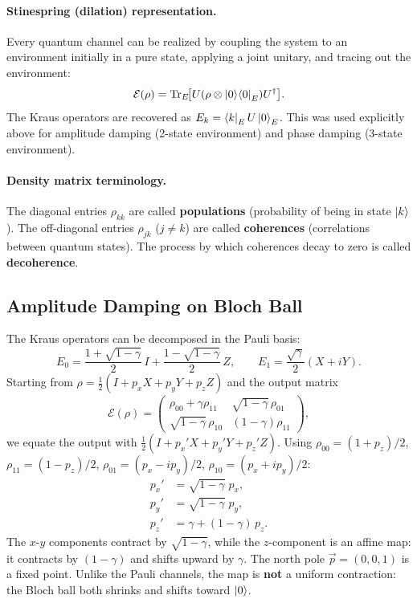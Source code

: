 \documentclass[10pt,a4paper]{article}
\begin{document}
\paragraph{Stinespring (dilation) representation.} Every quantum channel can be realized by coupling the system to an environment initially in a pure state, applying a joint unitary, and tracing out the environment:
\[
\mathcal{E}(\rho)=\mathrm{Tr}_E\!\bigl[U(\rho\otimes\ket{0}\!\bra{0}_E)U^\dagger\bigr].
\]
The Kraus operators are recovered as $E_k=\bra{k}_E U\ket{0}_E$. This was used explicitly above for amplitude damping (2-state environment) and phase damping (3-state environment).

\paragraph{Density matrix terminology.} The diagonal entries $\rho_{kk}$ are called \textbf{populations} (probability of being in state $\ket{k}$). The off-diagonal entries $\rho_{jk}$ ($j\ne k$) are called \textbf{coherences} (correlations between quantum states). The process by which coherences decay to zero is called \textbf{decoherence}.

\subsection{Amplitude Damping on Bloch Ball}

The Kraus operators can be decomposed in the Pauli basis:
\[
E_0=\frac{1+\sqrt{1-\gamma}}{2}\,I+\frac{1-\sqrt{1-\gamma}}{2}\,Z,\qquad E_1=\frac{\sqrt{\gamma}}{2}(X+iY).
\]
Starting from $\rho=\frac{1}{2}(I+p_xX+p_yY+p_zZ)$ and the output matrix
\[
\mathcal{E}(\rho)=\begin{pmatrix}\rho_{00}+\gamma\rho_{11}&\sqrt{1-\gamma}\,\rho_{01}\\\sqrt{1-\gamma}\,\rho_{10}&(1-\gamma)\rho_{11}\end{pmatrix},
\]
we equate the output with $\frac{1}{2}(I+p_x'X+p_y'Y+p_z'Z)$. Using $\rho_{00}=(1+p_z)/2$, $\rho_{11}=(1-p_z)/2$, $\rho_{01}=(p_x-ip_y)/2$, $\rho_{10}=(p_x+ip_y)/2$:
\begin{align}
p_x'&=\sqrt{1-\gamma}\;p_x,\nonumber\\
p_y'&=\sqrt{1-\gamma}\;p_y,\nonumber\\
p_z'&=\gamma+(1-\gamma)\,p_z.\nonumber
\end{align}
The $x$-$y$ components contract by $\sqrt{1-\gamma}$, while the $z$-component is an affine map: it contracts by $(1-\gamma)$ and shifts upward by $\gamma$. The north pole $\vec{p}=(0,0,1)$ is a fixed point. Unlike the Pauli channels, the map is \textbf{not} a uniform contraction: the Bloch ball both shrinks and shifts toward $\ket{0}$.
\end{document}
